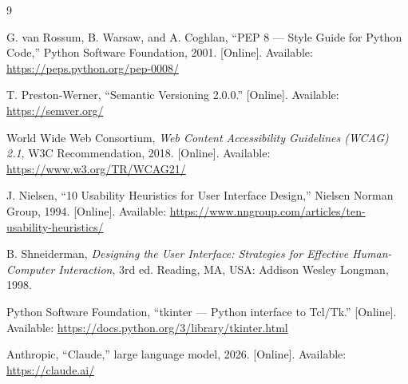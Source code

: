 \documentclass[11pt,a4paper]{article}
\begin{document}
\begin{thebibliography}{9}

G. van Rossum, B. Warsaw, and A. Coghlan, ``PEP 8 --- Style Guide for
Python Code,'' Python Software Foundation, 2001. [Online]. Available:
\url{https://peps.python.org/pep-0008/}

T. Preston-Werner, ``Semantic Versioning 2.0.0.'' [Online].
Available: \url{https://semver.org/}

World Wide Web Consortium, \emph{Web Content Accessibility Guidelines
(WCAG) 2.1}, W3C Recommendation, 2018. [Online]. Available:
\url{https://www.w3.org/TR/WCAG21/}

J. Nielsen, ``10 Usability Heuristics for User Interface Design,''
Nielsen Norman Group, 1994. [Online]. Available:
\url{https://www.nngroup.com/articles/ten-usability-heuristics/}

B. Shneiderman, \emph{Designing the User Interface: Strategies for
Effective Human-Computer Interaction}, 3rd ed. Reading, MA, USA:
Addison Wesley Longman, 1998.

Python Software Foundation, ``tkinter --- Python interface to Tcl/Tk.''
[Online]. Available: \url{https://docs.python.org/3/library/tkinter.html}

Anthropic, ``Claude,'' large language model, 2026. [Online].
Available: \url{https://claude.ai/}

\end{thebibliography}
\end{document}
